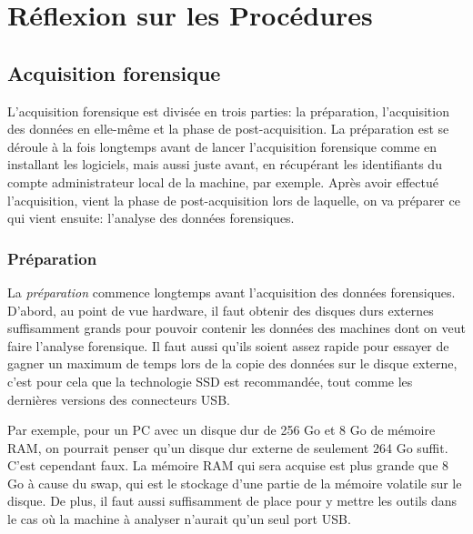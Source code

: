 
\chapter{Réflexion sur les Procédures}










\section{Acquisition forensique}

L'acquisition forensique est divisée en trois parties: la préparation, l'acquisition des données en elle-même et la phase de post-acquisition. La préparation est se déroule à la fois longtemps avant de lancer l'acquisition forensique comme en installant les logiciels, mais aussi juste avant, en récupérant les identifiants du compte administrateur local de la machine, par exemple. Après avoir effectué l'acquisition, vient la phase de post-acquisition lors de laquelle, on va préparer ce qui vient ensuite: l'analyse des données forensiques.





\subsection{Préparation}

La \textit{préparation} commence longtemps avant l'acquisition des données forensiques. D'abord, au point de vue hardware, il faut obtenir des disques durs externes suffisamment grands pour pouvoir contenir les données des machines dont on veut faire l'analyse forensique. Il faut aussi qu'ils soient assez rapide pour essayer de gagner un maximum de temps lors de la copie des données sur le disque externe, c'est pour cela que la technologie SSD est recommandée, tout comme les dernières versions des connecteurs USB.

\begin{example}
    \hspace{0.45cm} Par exemple, pour un PC avec un disque dur de 256 Go et 8 Go de mémoire RAM, on pourrait penser qu'un disque dur externe de seulement 264 Go suffit. C'est cependant faux. La mémoire RAM qui sera acquise est plus grande que 8 Go à cause du swap, qui est le stockage d'une partie de la mémoire volatile sur le disque. De plus, il faut aussi suffisamment de place pour y mettre les outils dans le cas où la machine à analyser n'aurait qu'un seul port USB.
\end{example}


